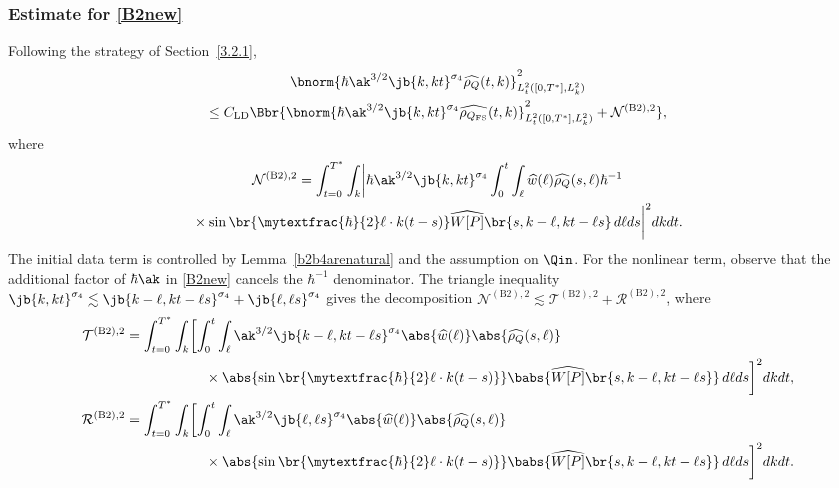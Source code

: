 \subsubsection{Estimate for \eqref{B2new}}
Following the strategy of Section~\ref{3.2.1},
\begin{multline*}
\bnorm{\hbar\ak^{3/2}\jb{k,kt}^{\sigma_4}\widehat{\rho_Q}(t,k)}_{L^2_{t}([0,T^*],L^2_k)}^2\\
\leq C_{\mathrm{LD}}\Bbr{\bnorm{\hbar\ak^{3/2}\jb{k,kt}^{\sigma_4}\widehat{\rho_{{Q_{\mathrm{FS}}}}}(t,k)}_{L^2_{t}([0,T^*],L^2_k)}^2+\mathcal {N}^{\mathrm{(B2),2}}},
\end{multline*}
where
\begin{multline*}
\mathcal {N}^{\mathrm{(B2),2}}=\int_{t=0}^{T^*}\int_k\biggl|\hbar\ak^{3/2}\jb{k,kt}^{\sigma_4}\int_0^t\int_\ell\widehat w(\ell)\widehat{\rho_Q}(s,\ell) \hbar^{-1}\\
{}\times\sin\br{\mytextfrac{\hbar}{2}\ell\cdot k(t-s)}\widehat {W[P]}\br{s,k-\ell,kt-\ell s}\,d\ell ds\biggr|^2dkdt.
\end{multline*}
The initial data term is controlled by Lemma~\ref{b2b4arenatural} and the assumption on $\Qin$. For the nonlinear term, observe that the additional factor of $\hbar\ak$ in \eqref{B2new} cancels the $\hbar^{-1}$ denominator. The triangle inequality $\jb{k,kt}^{\sigma_4}\lesssim \jb{k-\ell,kt-\ell s}^{\sigma_4}+\jb{\ell,\ell s}^{\sigma_4}$ gives the decomposition $\mathcal{N}^{\mathrm{(B2),2}}\lesssim \mathcal{T}^{\mathrm{(B2),2}}+\mathcal{R}^{\mathrm{(B2),2}}$, where
\begin{align*}
\mathcal {T}^{\mathrm{(B2),2}}&=\int_{t=0}^{T^*}\int_k\biggl[\int_0^t\int_\ell\ak^{3/2}\jb{k-\ell,kt-\ell s}^{\sigma_4}\abs{\widehat w(\ell)}\abs{\widehat{\rho_Q}(s,\ell)}\\
&\hspace{2cm}\times\abs{\sin\br{\mytextfrac{\hbar}{2}\ell\cdot k(t-s)}}\babs{\widehat {W[P]}\br{s,k-\ell,kt-\ell s}}\,d\ell ds\biggr]^2dkdt,\\
\mathcal {R}^{\mathrm{(B2),2}}&=\int_{t=0}^{T^*}\int_k\biggl[\int_0^t\int_\ell\ak^{3/2}\jb{\ell,\ell s}^{\sigma_4}\abs{\widehat w(\ell)}\abs{\widehat{\rho_Q}(s,\ell)} \\
&\hspace{2cm}\times\abs{\sin\br{\mytextfrac{\hbar}{2}\ell\cdot k(t-s)}}\babs{\widehat {W[P]}\br{s,k-\ell,kt-\ell s}}\,d\ell ds\biggr]^2dkdt.
\end{align*}

